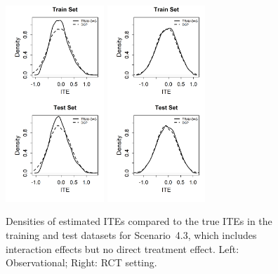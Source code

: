 \begin{figure}[htbp]
\centering
\includegraphics[width=0.33\textwidth]{img/results/observ_scenario3_ITE_densities_train_test.png}
\includegraphics[width=0.33\textwidth]{img/results/rct_scenario3_ITE_densities_train_test.png}
\vspace{-17pt}
\caption{Densities of estimated ITEs compared to the true ITEs in the training and test datasets for Scenario~4.3, which includes interaction effects but no direct treatment effect. Left: Observational; Right: RCT setting.}
\label{fig:scenario3_ite_densities_train_test}
\end{figure}






